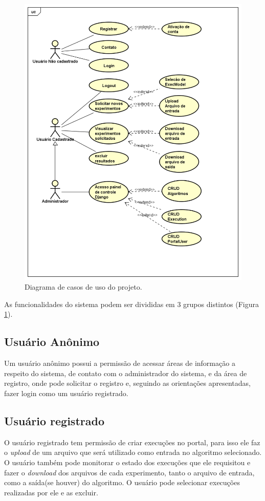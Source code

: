 \documentclass[tg]{mdtufsm}
\begin{document}
\begin{figure}
	\centering
	\includegraphics[width=1\textwidth]{UseCase_tg}
	\caption{
		Diagrama de casos de uso do projeto.
	}
	\label{fig:usecase}
\end{figure}

As funcionalidades do sistema podem ser divididas em 3 grupos distintos (Figura \ref{fig:usecase}).
\subsection{Usuário Anônimo}
Um usuário anônimo possui a permissão de acessar áreas de informação a respeito do sistema, de contato com o administrador do sistema, e da área de registro, onde pode solicitar o registro e, seguindo as orientações apresentadas, fazer login como um usuário registrado.
\subsection{Usuário registrado}
O usuário registrado tem permissão de criar execuções no portal, para isso ele faz o \emph{upload} de um arquivo que será utilizado como entrada no algoritmo selecionado. O usuário também pode monitorar o estado dos execuções que ele requisitou e fazer o \emph{download} dos arquivos de cada experimento, tanto o arquivo de entrada, como a saída(se houver) do algoritmo. O usuário pode selecionar execuções realizadas por ele e as excluir.
\end{document}
